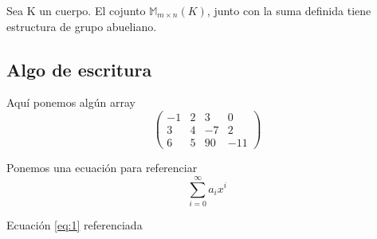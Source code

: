 \begin{lema}
	Sea K un cuerpo. El cojunto $\mathbb{M}_{m\times n}(K)$, junto con la suma definida tiene estructura de grupo abueliano.
\end{lema}


\subsection[Escritura]{Algo de escritura}
Aquí ponemos algún array
\[
\left (
\begin{array}{rrr|r} 
	-1 & 2 &  3 &   0 \\ 
	3 & 4 & -7 &   2\\
	6 & 5 & 90 & -11
\end{array} 
\right )
\]

Ponemos una ecuación para referenciar
\begin{equation} \label{eq:1} 
	\sum_{i=0}^{\infty} a_i x^i
\end{equation}

Ecuación \ref{eq:1} referenciada

